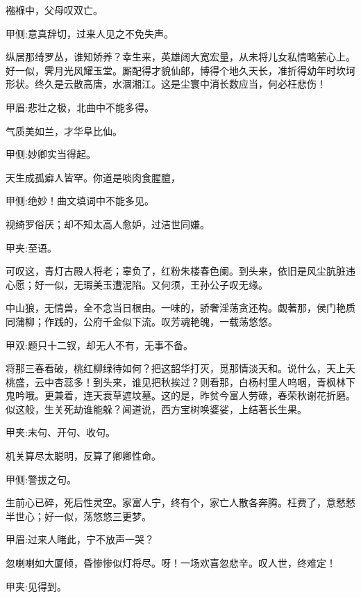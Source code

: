 \begin{qute2sp}
    襁褓中，父母叹双亡。\begin{note}甲侧:意真辞切，过来人见之不免失声。\end{note}纵居那绮罗丛，谁知娇养？幸生来，英雄阔大宽宏量，从未将儿女私情略萦心上。好一似，霁月光风耀玉堂。厮配得才貌仙郎，博得个地久天长，准折得幼年时坎坷形状。终久是云散高唐，水涸湘江。这是尘寰中消长数应当，何必枉悲伤！\begin{note}甲眉:悲壮之极，北曲中不能多得。\end{note}
\end{qute2sp}


\begin{qute2sp}
    气质美如兰，才华阜比仙。\begin{note}甲侧:妙卿实当得起。\end{note}天生成孤癖人皆罕。你道是啖肉食腥膻，\begin{note}甲侧:绝妙！曲文填词中不能多见。\end{note}视绮罗俗厌；却不知太高人愈妒，过洁世同嫌。\begin{note}甲夹:至语。\end{note}可叹这，青灯古殿人将老；辜负了，红粉朱楼春色阑。到头来，依旧是风尘肮脏违心愿；好一似，无瑕美玉遭泥陷。又何须，王孙公子叹无缘。
\end{qute2sp}


\begin{qute2sp}
    中山狼，无情兽，全不念当日根由。一味的，骄奢淫荡贪还构。觑著那，侯门艳质同蒲柳；作践的，公府千金似下流。叹芳魂艳魄，一载荡悠悠。\begin{note}甲双:题只十二钗，却无人不有，无事不备。\end{note}
\end{qute2sp}


\begin{qute2sp}
    将那三春看破，桃红柳绿待如何？把这韶华打灭，觅那情淡天和。说什么，天上夭桃盛，云中杏蕊多！到头来，谁见把秋挨过？则看那，白杨村里人呜咽，青枫林下鬼吟哦。更兼着，连天衰草遮坟墓。这的是，昨贫今富人劳碌，春荣秋谢花折磨。似这般，生关死劫谁能躲？闻道说，西方宝树唤婆娑，上结著长生果。\begin{note}甲夹:末句、开句、收句。\end{note}
\end{qute2sp}


\begin{qute2sp}
    机关算尽太聪明，反算了卿卿性命。\begin{note}甲侧:警拔之句。\end{note}生前心已碎，死后性灵空。家富人宁，终有个，家亡人散各奔腾。枉费了，意慭慭半世心；好一似，荡悠悠三更梦。\begin{note}甲眉:过来人睹此，宁不放声一哭？\end{note}忽喇喇如大厦倾，昏惨惨似灯将尽。呀！一场欢喜忽悲辛。叹人世，终难定！\begin{note}甲夹:见得到。\end{note}
\end{qute2sp}


